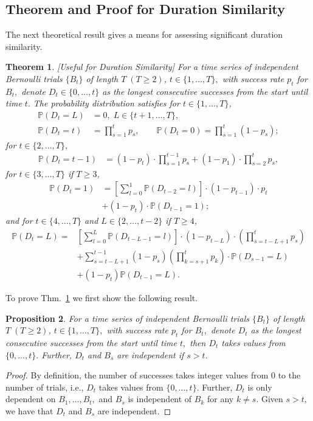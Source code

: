 \documentclass{article}
\theoremstyle{plain}
\newtheorem{theorem}{Theorem}[section]
\newtheorem{proposition}[theorem]{Proposition}
\theoremstyle{definition}
\theoremstyle{remark}
\begin{document}
\subsection{Theorem and Proof for Duration Similarity}
The next theoretical result gives a means for assessing significant duration similarity.
\begin{theorem}
\label{thm:longest_consecutive_successes_distribution}
[Useful for Duration Similarity] For a time series of independent Bernoulli trials $\{B_t\}$ of length $T\;(T\geq 2)$,  $t\in\{1, \dots, T\},$ with success rate $p_t$ for $B_t,$ denote $D_t \in \{0, \dots, t\}$ as the longest consecutive successes from the start until time $t.$  The probability distribution satisfies for $t\in\{1, \dots, T\}$,
\begin{align}
    \mathbb{P}(D_t=L)&=0,\;
    L\in\{t+1, \dots, T\},\\
    \mathbb{P}(D_t=t) &=\prod_{s=1}^t p_s, \quad \quad 
    \mathbb{P}(D_t=0) =\prod_{s=1}^t(1-p_s);
    \end{align}
    for $t\in\{2, \dots, T\},$
    \begin{align}
    \mathbb{P}(D_t=t-1)
    &=(1-p_t)\cdot\prod_{s=1}^{t-1} p_s +(1-p_1)\cdot \prod_{s=2}^{t} p_s,
    \end{align}
    for $t\in\{3, \dots, T\}$ if $T\geq 3$,
    \begin{align}
    \mathbb{P}(D_t=1) &=\left[\sum_{l=0}^{1}\mathbb{P}(D_{t-2}=l)\right]\cdot(1-p_{t-1})\cdot p_t \nonumber\\
    &+ (1-p_t)\cdot \mathbb{P}(D_{t-1}=1);
    \end{align}
    and for $t\in\{4, \dots, T\}$ and $L\in\{2, \dots, t-2\}$ if $T\geq 4$,
    \begin{align}
    \mathbb{P}(D_t=L) =& \left[\sum_{l=0}^{L}\mathbb{P}(D_{t-L-1}=l)\right]\cdot
   (1-p_{t-L})\cdot\left(\prod_{s=t-L+1}^t p_s\right) \nonumber\\
    &+ \sum_{s=t-L+1}^{t-1}(1-p_s)
    \left(\prod_{k=s+1}^t p_k\right)\cdot
    \mathbb{P}(D_{s-1}=L)\\
    &+ (1-p_t)
    \mathbb{P}(D_{t-1}=L).
\end{align}
\end{theorem}

To prove Thm.~\ref{thm:longest_consecutive_successes_distribution} we first show the following result. 

\begin{proposition}\label{prop:independence_M_B}
For a time series of independent Bernoulli trials $\{B_t\}$ of length $T\;(T\geq 2)$, $t\in\{1, \dots, T\},$ with success rate $p_t$ for $B_t,$ denote $D_t$ as the longest consecutive successes from the start until time $t,$ then $D_t$ takes values from $\{0, \dots, t\}.$  Further, $D_t$ and $B_s$ are independent if $s>t.$
\end{proposition}
\begin{proof}
By definition, the number of successes takes integer values from 0 to the number of trials, i.e., $D_t$ takes values from $\{0, \dots, t\}.$ Further, $D_t$ is only dependent on $B_1, \dots, B_t,$ and $B_s$ is independent of $B_k$ for any $k\neq s.$ Given $s>t,$ we have that $D_t$ and $B_s$ are independent.
\end{proof}
\end{document}
